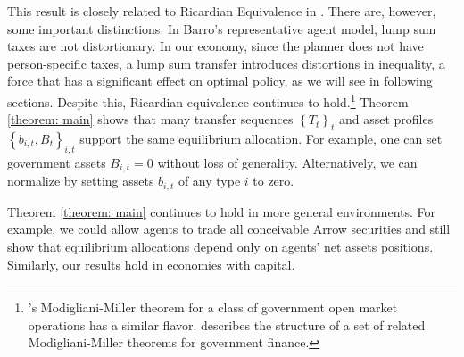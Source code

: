 \documentclass[11.5pt,twoside]{article}
\begin{document}
%

\smallskip
This result is closely related to Ricardian Equivalence in \citet{Barro1974}. There are, however, some important distinctions. In Barro's representative agent model, lump sum taxes are not distortionary. In our economy, since the planner does not have person-specific taxes, a lump sum transfer introduces distortions in inequality, a  force that has a significant effect on optimal policy,  as we will see in following sections.   Despite this, Ricardian equivalence continues to hold.\footnote{%
\citet{Wallace1981}'s Modigliani-Miller theorem for a class of government open
market operations has a similar flavor. \citet{sargent1987dynamic} describes the
structure of a set of related Modigliani-Miller theorems for government
finance.} %
Theorem \ref{theorem: main} shows that many  transfer
sequences $\left\{ T_{t}\right\} _{t}$ and asset profiles $\left\{
b_{i,t},B_{t}\right\} _{i,t}$  support the same  equilibrium allocation.
For example, one can set government assets $B_{i,t}=0$ without loss of
generality.
Alternatively,  we can normalize by setting assets $b_{i,t}$ of any type $i$ to zero.

Theorem \ref{theorem: main} continues to hold in more general environments. For example, we could allow
agents to trade all conceivable  Arrow securities and still show that  equilibrium
allocations depend only on agents' net assets positions.
Similarly, our results   hold in  economies with capital.
%
\end{document}
